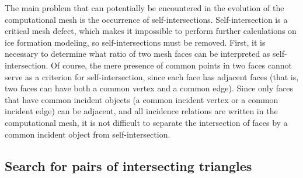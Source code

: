 \documentclass[
11pt,%
tightenlines,%
twoside,%
onecolumn,%
nofloats,%
nobibnotes,%
nofootinbib,%
superscriptaddress,%
noshowpacs,%
centertags]%
{revtex4-2}
\begin{document}
The main problem that can potentially be encountered in the evolution of the computational mesh is the occurrence of self-intersections.
Self-intersection is a critical mesh defect, which makes it impossible to perform further calculations on ice formation modeling, so self-intersections must be removed.
First, it is necessary to determine what ratio of two mesh faces can be interpreted as self-intersection.
Of course, the mere presence of common points in two faces cannot serve as a criterion for self-intersection, since each face has adjacent faces (that is, two faces can have both a common vertex and a common edge).
Since only faces that have common incident objects  (a common
incident vertex or a common incident edge) can be adjacent, and all
incidence relations are written in the computational mesh, it is not
difficult to separate the intersection of faces by a common incident
object from self-intersection.

\subsection{Search for pairs of intersecting triangles}
\end{document}
